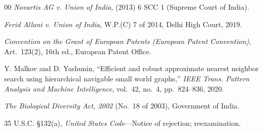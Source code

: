 \documentclass[conference]{IEEEtran}
\begin{document}
\begin{thebibliography}{00}
 \emph{Novartis AG v. Union of India}, (2013) 6 SCC 1 (Supreme Court of India).

 \emph{Ferid Allani v. Union of India}, W.P.(C) 7 of 2014, Delhi High Court, 2019.

 \emph{Convention on the Grant of European Patents (European Patent Convention)}, Art.~123(2), 16th ed., European Patent Office.

 Y. Malkov and D. Yashunin, ``Efficient and robust approximate nearest neighbor search using hierarchical navigable small world graphs,'' \emph{IEEE Trans. Pattern Analysis and Machine Intelligence}, vol.~42, no.~4, pp.~824--836, 2020.

 \emph{The Biological Diversity Act, 2002} (No.~18 of 2003), Government of India.

 35 U.S.C. \S132(a), \emph{United States Code}---Notice of rejection; reexamination.

\end{thebibliography}
\end{document}
